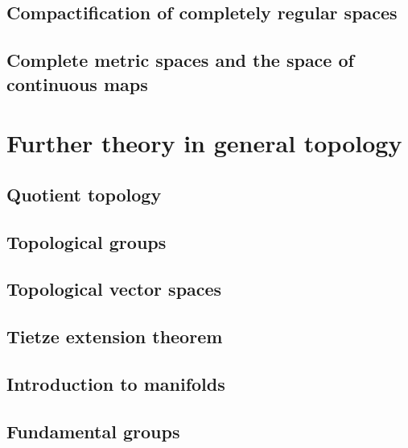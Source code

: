 \chapter{Compactification of completely regular spaces}\label{compactification}
    
    

\chapter{Complete metric spaces and the space of continuous maps}\label{completeness and C0 spaces}
    
    
    
    


\part{Further theory in general topology}

\chapter{Quotient topology}\label{quotient topology}
    
    

\chapter{Topological groups}\label{topological groups}
    
    
    

\chapter{Topological vector spaces}\label{topological vector spaces}
    
    

\chapter{Tietze extension theorem}\label{Tietze extn thm}
    

\chapter{Introduction to manifolds}\label{introduction to manifolds}
    

\chapter{Fundamental groups}\label{fundamental groups}


